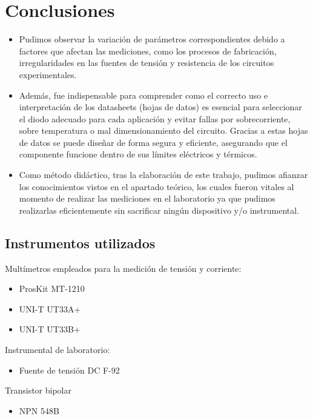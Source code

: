 \chapter{Conclusiones}

\begin{itemize}
    \item Pudimos observar la variación de parámetros correspondientes debido a factores que afectan las mediciones, como los procesos de fabricación, irregularidades en las fuentes de tensión y resistencia de los circuitos experimentales.

\item Además, fue indispensable para comprender como el correcto uso e interpretación de los datasheets (hojas de datos) es esencial para seleccionar el diodo adecuado para cada aplicación y evitar fallas por sobrecorriente, sobre temperatura o mal dimensionamiento del circuito. Gracias a estas hojas de datos se puede diseñar de forma segura y eficiente, asegurando que el componente funcione dentro de sus límites eléctricos y térmicos.

\item Como método didáctico, tras la elaboración de este trabajo, pudimos afianzar los conocimientos vistos en el apartado teórico, los cuales fueron vitales al momento de realizar las mediciones en el laboratorio ya que pudimos realizarlas eficientemente sin sacrificar ningún dispositivo y/o instrumental.
\end{itemize}

\section{Instrumentos utilizados}
Multímetros empleados para la medición de tensión y corriente:
\begin{itemize}
    \item ProsKit MT-1210
    \item UNI-T UT33A+
    \item UNI-T UT33B+    
\end{itemize}

Instrumental de laboratorio: 
\begin{itemize}
    \item Fuente de tensión DC F-92
\end{itemize}

Transistor bipolar
\begin{itemize}
    \item NPN 548B
\end{itemize}

